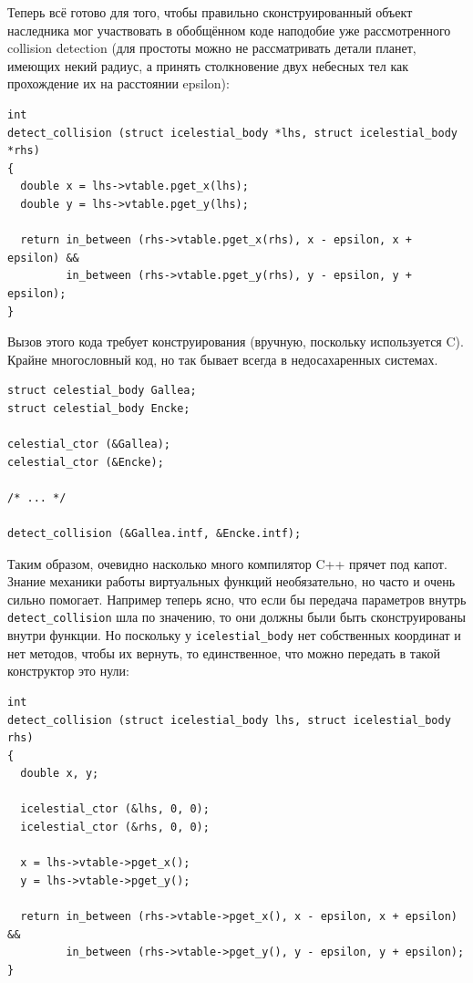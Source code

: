 \documentclass[a4paper,12pt,oneside]{article}
\begin{document}
Теперь всё готово для того, чтобы правильно сконструированный объект наследника мог участвовать в обобщённом коде наподобие уже рассмотренного collision detection (для простоты можно не рассматривать детали планет, имеющих некий радиус, а принять столкновение двух небесных тел как прохождение их на расстоянии epsilon):

\begin{lstlisting}
int
detect_collision (struct icelestial_body *lhs, struct icelestial_body *rhs)
{
  double x = lhs->vtable.pget_x(lhs);
  double y = lhs->vtable.pget_y(lhs);
 
  return in_between (rhs->vtable.pget_x(rhs), x - epsilon, x + epsilon) && 
         in_between (rhs->vtable.pget_y(rhs), y - epsilon, y + epsilon);
}
\end{lstlisting}

Вызов этого кода требует конструирования (вручную, поскольку используется C). Крайне многословный код, но так бывает всегда в недосахаренных системах.

\begin{lstlisting}
struct celestial_body Gallea;
struct celestial_body Encke;

celestial_ctor (&Gallea);
celestial_ctor (&Encke);

/* ... */

detect_collision (&Gallea.intf, &Encke.intf);
\end{lstlisting}

Таким образом, очевидно насколько много компилятор C++ прячет под капот. Знание механики работы виртуальных функций необязательно, но часто и очень сильно помогает. Например теперь ясно, что если бы передача параметров внутрь \lstinline!detect_collision! шла по значению, то они должны были быть сконструированы внутри функции. Но поскольку у \lstinline!icelestial_body! нет собственных координат и нет методов, чтобы их вернуть, то единственное, что можно передать в такой конструктор это нули:

\begin{lstlisting}
int
detect_collision (struct icelestial_body lhs, struct icelestial_body rhs)
{
  double x, y;
  
  icelestial_ctor (&lhs, 0, 0);
  icelestial_ctor (&rhs, 0, 0);

  x = lhs->vtable->pget_x();
  y = lhs->vtable->pget_y();
 
  return in_between (rhs->vtable->pget_x(), x - epsilon, x + epsilon) && 
         in_between (rhs->vtable->pget_y(), y - epsilon, y + epsilon);
}
\end{lstlisting}
\end{document}
